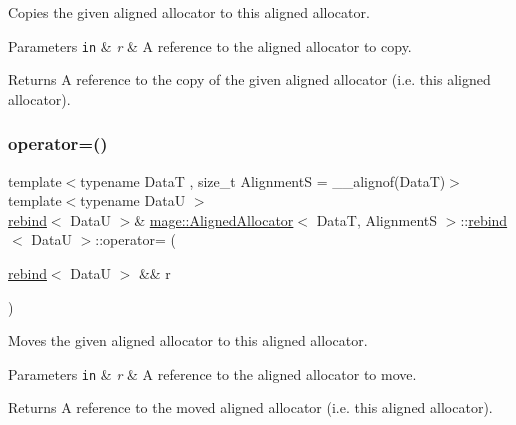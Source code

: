 Copies the given aligned allocator to this aligned allocator.


\begin{DoxyParams}[1]{Parameters}
\mbox{\tt in}  & {\em r} & A reference to the aligned allocator to copy. \\
\hline
\end{DoxyParams}
\begin{DoxyReturn}{Returns}
A reference to the copy of the given aligned allocator (i.\+e. this aligned allocator). 
\end{DoxyReturn}
\hypertarget{structmage_1_1_aligned_allocator_1_1rebind_a4345d236bd6d9abfc475ec575dc8dde2}{}\label{structmage_1_1_aligned_allocator_1_1rebind_a4345d236bd6d9abfc475ec575dc8dde2} 
\subsubsection{\texorpdfstring{operator=()}{operator=()}\hspace{0.1cm}{\footnotesize\ttfamily [2/2]}}
{\footnotesize\ttfamily template$<$typename DataT , size\+\_\+t AlignmentS = \+\_\+\+\_\+alignof(\+Data\+T)$>$ \\
template$<$typename DataU $>$ \\
\hyperlink{structmage_1_1_aligned_allocator_1_1rebind}{rebind}$<$ DataU $>$\& \hyperlink{structmage_1_1_aligned_allocator}{mage\+::\+Aligned\+Allocator}$<$ DataT, AlignmentS $>$\+::\hyperlink{structmage_1_1_aligned_allocator_1_1rebind}{rebind}$<$ DataU $>$\+::operator= (\begin{DoxyParamCaption}\item[{\hyperlink{structmage_1_1_aligned_allocator_1_1rebind}{rebind}$<$ DataU $>$ \&\&}]{r }\end{DoxyParamCaption})\hspace{0.3cm}{\ttfamily [delete]}}

Moves the given aligned allocator to this aligned allocator.


\begin{DoxyParams}[1]{Parameters}
\mbox{\tt in}  & {\em r} & A reference to the aligned allocator to move. \\
\hline
\end{DoxyParams}
\begin{DoxyReturn}{Returns}
A reference to the moved aligned allocator (i.\+e. this aligned allocator). 
\end{DoxyReturn}
